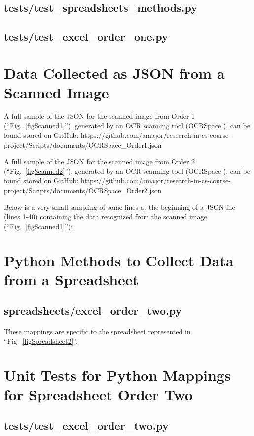 \documentclass[conference]{IEEEtran}
\begin{document}
    \subsection{tests/test\_spreadsheets\_methods.py}
    

    \newpage
    \subsection{tests/test\_excel\_order\_one.py}
    

\newpage
\section{Data Collected as JSON from a Scanned Image} \label{appendixOrderOneJSON}
A full sample of the JSON for the scanned image from Order 1 (``Fig.~\ref{figScanned1}''), generated by an OCR scanning tool (OCRSpace \cite{ocrspace}), can be found stored on GitHub: https://github.com/amajor/research-in-cs-course-project/Scripts/documents/OCRSpace\_Order1.json

A full sample of the JSON for the scanned image from Order 2 (``Fig.~\ref{figScanned2}''), generated by an OCR scanning tool (OCRSpace \cite{ocrspace}), can be found stored on GitHub: https://github.com/amajor/research-in-cs-course-project/Scripts/documents/OCRSpace\_Order2.json

Below is a very small sampling of some lines at the beginning of a JSON file (lines 1-40) containing the data recognized from the scanned image (``Fig.~\ref{figScanned1}''):


% 

\newpage
\section{Python Methods to Collect Data from a Spreadsheet} \label{appendixOrderTwo}
    \subsection{spreadsheets/excel\_order\_two.py}
    These mappings are specific to the spreadsheet represented in ``Fig.~\ref{figSpreadsheet2}''.
    

\newpage
\section{Unit Tests for Python Mappings for Spreadsheet Order Two} \label{appendixOrderTwoTests}
    \subsection{tests/test\_excel\_order\_two.py}
    
\end{document}
